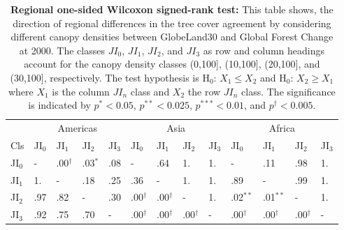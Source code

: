 			\begin{table}[ht]
				\centering
				\caption[Regional one-sided Wilcoxon signed-rank test]{\textbf{Regional one-sided Wilcoxon signed-rank test:} This table shows, the direction of regional differences in the tree cover agreement by considering different canopy densities between GlobeLand30 and Global Forest Change at 2000. The classes $JI_0$, $JI_1$, $JI_2$, and $JI_3$ as row and column headings account for the canopy density classes (0,100], (10,100], (20,100], and (30,100], respectively. The test hypothesis is H$_0$: $X_1\leq X_2$ and H$_0$: $X_2\geq X_1$ where $X_1$ is the column $JI_n$ class and $X_2$ the row $JI_n$ class. The significance is indicated by $p^{*}<0.05$, $p^{**}<0.025$, $p^{***}<0.01$, and $p^{\dagger}<0.005$.}
				\label{tab:wilcoxononesided_regions}
				\begin{tabular}{lllllllllllll}
					\hline
					& \multicolumn{4}{|c}{Americas} & \multicolumn{4}{|c|}{Asia} & \multicolumn{4}{c|}{Africa} \\
					Cls & JI$_0$ & JI$_1$ & JI$_2$ & JI$_3$ & JI$_0$ & JI$_1$ & JI$_2$ & JI$_3$ & JI$_0$ & JI$_1$ & JI$_2$ & JI$_3$ \\\hline
					JI$_0$ & - & .00$^{\dagger}$ & .03$^{*}$ & .08 & - & .64 & 1. & 1. & - & .11 & .98 & 1. \\
					JI$_1$ & 1. & - & .18 & .25 & .36 & - & 1. & 1. & .89 & - & .99 & 1. \\
					JI$_2$ & .97 & .82 & - & .30 & .00$^{\dagger}$ & .00$^{\dagger}$ & - & 1. & .02$^{**}$ & .01$^{**}$ & - & 1. \\
					JI$_3$ & .92 & .75 & .70 & - & .00$^{\dagger}$ & .00$^{\dagger}$ & .00$^{\dagger}$ & - & .00$^{\dagger}$ & .00$^{\dagger}$ & .00$^{\dagger}$ & - \\\hline
				\end{tabular}
			\end{table}

